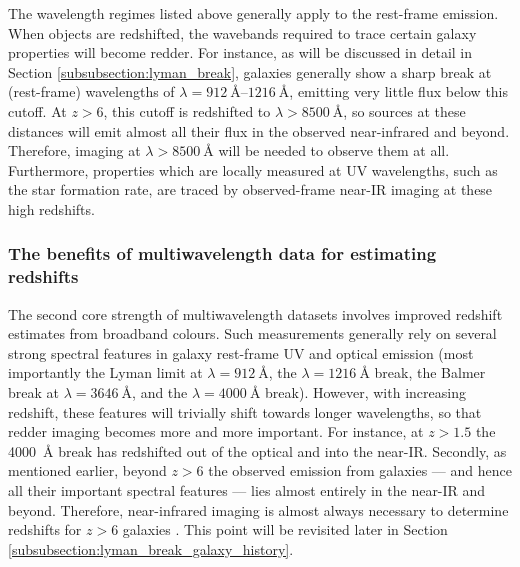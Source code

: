 The wavelength regimes listed above generally apply to the rest-frame emission. When objects are redshifted, the wavebands required to trace certain galaxy properties will become redder. For instance, as will be discussed in detail in Section \ref{subsubsection:lyman_break}, galaxies generally show a sharp break at (rest-frame) wavelengths of $\lambda=\SIrange{912}{1216}{\angstrom}$, emitting very little flux below this cutoff. At $z>6$, this cutoff is redshifted to $\lambda>\SI{8500}{\angstrom}$, so sources at these distances will emit almost all their flux in the observed near-infrared and beyond. Therefore, imaging at $\lambda> \SI{8500}{\angstrom}$ will be needed to observe them at all. Furthermore, properties which are locally measured at UV wavelengths, such as the star formation rate, are traced by observed-frame near-IR imaging at these high redshifts. \par

 
\subsubsection{The benefits of multiwavelength data for estimating redshifts}\label{subsubsection:multiwavelength_redshifts}

The second core strength of multiwavelength datasets involves improved redshift estimates from broadband colours. Such measurements generally rely on several strong spectral features in galaxy rest-frame UV and optical emission (most importantly the Lyman limit at $\lambda = \SI{912}{\angstrom} $, the $\lambda=\SI{1216}{\angstrom}$ break, the Balmer break at $\lambda=\SI{3646}{\angstrom}$, and the $\lambda = \SI{4000}{\angstrom}$ break). However, with increasing redshift, these features will trivially shift towards longer wavelengths, so that redder imaging becomes more and more important. For instance, at $z>1.5$ the \SI{4000}{\angstrom} break has redshifted out of the optical and into the near-IR. Secondly, as mentioned earlier, beyond $z>6$ the observed emission from galaxies --- and hence all their important spectral features --- lies almost entirely in the near-IR and beyond. Therefore, near-infrared imaging is almost always necessary to determine redshifts for $z>6$ galaxies  \citep{2009MNRAS.395.2196M,2014MNRAS.440.2810B}. This point will be revisited later in Section \ref{subsubsection:lyman_break_galaxy_history}. \par




